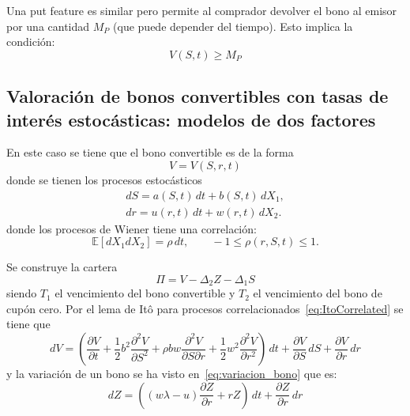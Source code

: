Una put feature es similar pero permite al comprador devolver el bono al emisor por una cantidad $M_P$ (que puede depender del tiempo). Esto implica la condición:
\begin{equation*}
    \boxed{V(S,t) \geq M_P}
\end{equation*}




\subsection{Valoración de bonos convertibles con tasas de interés estocásticas: modelos de dos factores}
En este caso se tiene que el bono convertible es de la forma
\begin{equation*}
    V = V(S,r,t)
\end{equation*}
donde se tienen los procesos estocásticos
\begin{align*}
    dS = a(S,t)\,dt + b(S,t)\,dX_1, \\[2ex]
    dr = u(r,t)\,dt + w(r,t)\,dX_2.
\end{align*}
donde los procesos de Wiener tiene una correlación:
\begin{equation*}
    \mathbb{E}[dX_1 dX_2] = \rho\,dt, \qquad -1\leq \rho(r,S,t) \leq 1.
\end{equation*}

Se construye la cartera
\begin{equation*}
    \Pi = V - \Delta_2 Z - \Delta_1 S
\end{equation*}
siendo $T_1$ el vencimiento del bono convertible y $T_2$ el vencimiento del bono de cupón cero.
Por el lema de Itô para procesos correlacionados~\eqref{eq:ItoCorrelated} se tiene que
\begin{equation*}
    dV = \left( \frac{\partial V}{\partial t} + \frac{1}{2} b^2 \frac{\partial^2 V}{\partial S^2} + \rho b w \frac{\partial^2 V}{\partial S \partial r} + \frac{1}{2} w^2 \frac{\partial^2 V}{\partial r^2} \right)\,dt + \frac{\partial V}{\partial S}\,dS + \frac{\partial V}{\partial r}\,dr
\end{equation*}
y la variación de un bono se ha visto en~\eqref{eq:variacion_bono} que es:
\begin{equation*}
    dZ = \left((w\lambda - u) \frac{\partial Z}{\partial r} + rZ\right)\,dt + \frac{\partial Z}{\partial r}\,dr
\end{equation*}

